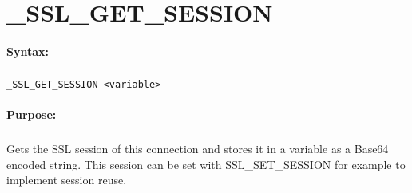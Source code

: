 
\newpage
\section{\_SSL\_GET\_SESSION}
\label{cmd:_SSL_GET_SESSION}

\paragraph{Syntax:}
\subparagraph{}
\texttt{\_SSL\_GET\_SESSION <variable>}

\paragraph{Purpose:}
\subparagraph{}
Gets the SSL session of this connection and stores it in a variable as a Base64 encoded string.
This session can be set with SSL\_SET\_SESSION for example to implement session reuse.
